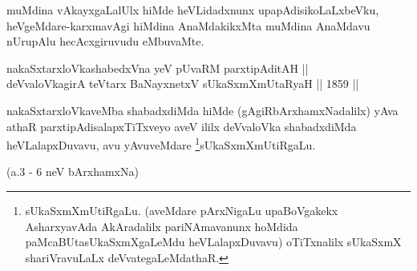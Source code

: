 \begin{artha}
muMdina vAkayxgaLalUlx hiMde heVLidadxnunx upapAdisikoLaLxbeVku,
heVgeMdare-karxmavAgi hiMdina AnaMdakikxMta muMdina AnaMdavu nUrupAlu
hecAcxgiruvudu eMbuvaMte.
\end{artha}


\begin{shl}
nakaSxtarxloVkashabedxVna yeV pUvaRM parxtipAditAH ||  \\
deVvaloVkagirA teV\s tarx BaNayxnetxV sUkaSxmXmUtaRyaH \hfill || 1859 ||  
\end{shl}

\begin{artha}
nakaSxtarxloVkaveMba shabadxdiMda hiMde (gAgiRbArxhamxNadalilx) yAva
athaR parxtipAdisalapxTiTxveyo aveV ililx deVvaloVka shabadxdiMda
heVLalapxDuvavu, avu yAvuveMdare \footnote[1]{sUkaSxmXmUtiRgaLu.
(aveMdare pArxNigaLu upaBoVgakekx AsharxyavAda AkAradalilx
pariNAmavanunx hoMdida paMcaBUtasUkaSxmXgaLeMdu heVLalapxDuvavu)
oTiTxnalilx sUkaSxmX shariVravuLaLx deVvategaLeMdathaR.}sUkaSxmXmUtiRgaLu.
\end{artha}

(a.3 - 6 neV bArxhamxNa)  
